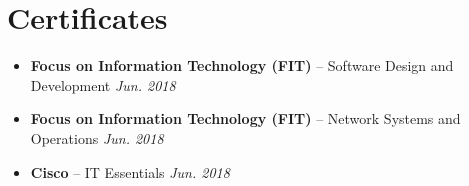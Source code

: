 \documentclass[letterpaper,11pt]{article}
\newcommand{\resumeSubHeadingListStart}{\begin{itemize}[leftmargin=*]}
\newcommand{\resumeSubHeadingListEnd}{\end{itemize}}
\begin{document}
\section{Certificates}
 \resumeSubHeadingListStart
   \item{\small{\textbf{Focus on Information Technology (FIT)}{ – Software Design and Development}} \hfill \textit{\small{Jun. 2018}}}
   \item{\small{\vspace{-6pt} \textbf{Focus on Information Technology (FIT)}{ – Network Systems and Operations}} \hfill \textit{\small{Jun. 2018}} }
   \item{\small{\vspace{-6pt} \textbf{Cisco}{ – IT Essentials}} \hfill \textit{\small{Jun. 2018}}}
 \resumeSubHeadingListEnd

\end{document}
